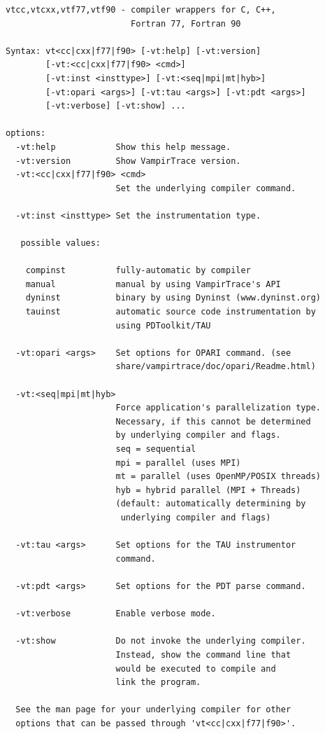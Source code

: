 \documentclass[a4paper,twoside,12pt,BCOR12mm]{scrbook}
\begin{document}
\begin{latexonly}
\latex{\begin{small}}
\begin{verbatim}
vtcc,vtcxx,vtf77,vtf90 - compiler wrappers for C, C++, 
                         Fortran 77, Fortran 90

Syntax: vt<cc|cxx|f77|f90> [-vt:help] [-vt:version]
        [-vt:<cc|cxx|f77|f90> <cmd>] 
        [-vt:inst <insttype>] [-vt:<seq|mpi|mt|hyb>] 
        [-vt:opari <args>] [-vt:tau <args>] [-vt:pdt <args>] 
        [-vt:verbose] [-vt:show] ...

options:
  -vt:help            Show this help message.
  -vt:version         Show VampirTrace version.
  -vt:<cc|cxx|f77|f90> <cmd>
                      Set the underlying compiler command.

  -vt:inst <insttype> Set the instrumentation type.

   possible values:

    compinst          fully-automatic by compiler
    manual            manual by using VampirTrace's API
    dyninst           binary by using Dyninst (www.dyninst.org)
    tauinst           automatic source code instrumentation by
                      using PDToolkit/TAU

  -vt:opari <args>    Set options for OPARI command. (see
                      share/vampirtrace/doc/opari/Readme.html)

  -vt:<seq|mpi|mt|hyb>
                      Force application's parallelization type.
                      Necessary, if this cannot be determined
                      by underlying compiler and flags.
                      seq = sequential
                      mpi = parallel (uses MPI)
                      mt = parallel (uses OpenMP/POSIX threads)
                      hyb = hybrid parallel (MPI + Threads)
                      (default: automatically determining by
                       underlying compiler and flags)

  -vt:tau <args>      Set options for the TAU instrumentor 
                      command.

  -vt:pdt <args>      Set options for the PDT parse command.

  -vt:verbose         Enable verbose mode.

  -vt:show            Do not invoke the underlying compiler.
                      Instead, show the command line that 
                      would be executed to compile and 
                      link the program.

  See the man page for your underlying compiler for other 
  options that can be passed through 'vt<cc|cxx|f77|f90>'.


\end{verbatim}
\end{latexonly}
\end{document}
